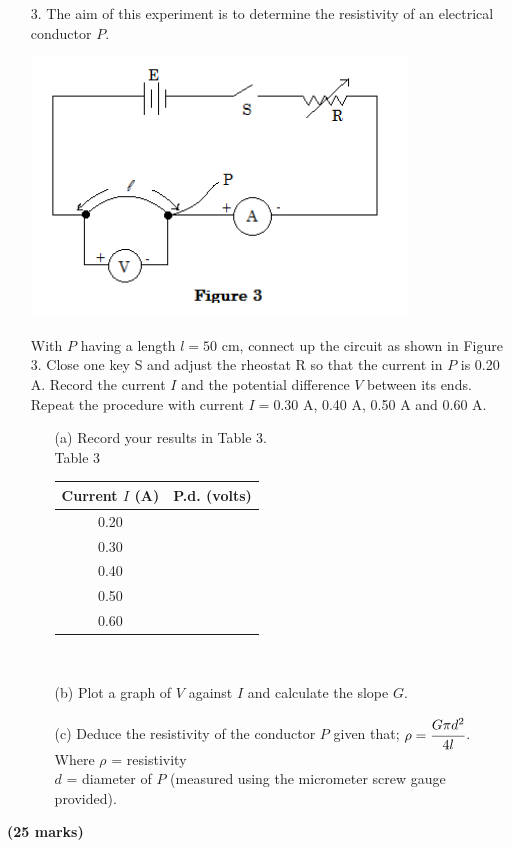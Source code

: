 \begin{enumerate}
\item[3.] The aim of this experiment is to determine the resistivity of an electrical conductor $P$.

\begin{center}
\includegraphics[width=10cm]{./img/2010-3-alt.png}
\end{center}

With $P$ having a length $l = 50$ cm, connect up the circuit as shown in Figure 3. Close one key S and adjust the rheostat R so that the current in $P$ is 0.20 A. Record the current $I$ and the potential difference $V$ between its ends.\\[10pt]

Repeat the procedure with current $I = $0.30 A, 0.40 A, 0.50 A and 0.60 A.
\begin{enumerate}
\item[(a)] Record your results in Table 3.\\[10pt]

Table 3\\[10pt]

\begin{tabular}{|p{3cm}|p{3cm}|} \hline
\multicolumn{1}{|c|}{Current $I$ (A)} & \multicolumn{1}{c|}{P.d. (volts)} \\ \hline
\multicolumn{1}{|c|}{0.20} &  \\ \hline
\multicolumn{1}{|c|}{0.30} &  \\ \hline
\multicolumn{1}{|c|}{0.40} &  \\ \hline
\multicolumn{1}{|c|}{0.50} &  \\ \hline
\multicolumn{1}{|c|}{0.60} &  \\ \hline
\end{tabular}\\[10pt]

\item[(b)] Plot a graph of $V$ against $I$ and calculate the slope $G$.
\item[(c)] Deduce the resistivity of the conductor $P$ given that; $\rho = \cfrac{G\pi d^2}{4l}$.\\[10pt]
Where $\rho$ = resistivity\\
$d$ = diameter of $P$ (measured using the micrometer screw gauge provided).
\end{enumerate}
\end{enumerate}

\flushright \textbf{(25 marks)}
\flushleft